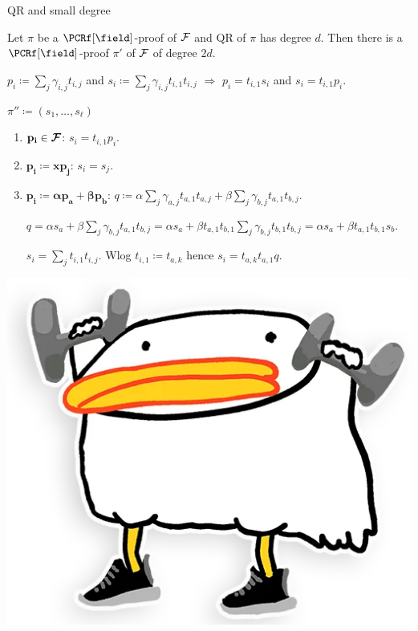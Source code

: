 \begin{frame}{QR and small degree}
    
    \begin{lemma}
        Let $\pi$ be a $\PCRf[\field]$-proof of $\mathcal{F}$ and QR of $\pi$ has degree $d$. Then there is a
        $\PCRf[\field]$-proof $\pi'$ of $\mathcal{F}$ of degree $2d$.
    \end{lemma}

    \pause
    $p_i \coloneqq \sum\limits_{j} \gamma_{i, j} t_{i, j}$ and $s_i \coloneqq \sum\limits_{j}
    \gamma_{i, j} t_{i, 1} t_{i, j}$
    \hspace{0.4cm} $\Rightarrow$ \hspace{0.4cm} $p_i = t_{i, 1} s_i$ and $s_i = t_{i, 1} p_i$.

    \pause
    $\pi'' \coloneqq (s_1, \dots, s_{\ell})$
    \pause
    \begin{enumerate}
        \item $\mathbf{p_i \in \boldsymbol{\mathcal{F}}}$: \hspace{0.3cm} $s_i = t_{i, 1} p_i$.
        \item $\mathbf{p_i \coloneqq x p_j}$: \hspace{0.3cm} $s_i = s_j$.
        \item $\mathbf{p_i \coloneqq \boldsymbol{\alpha} p_a + \boldsymbol{\beta} p_b}$: \hspace{0.3cm}
            \pause $q \coloneqq \alpha \sum\limits_{j} \gamma_{a, j} t_{a, 1} t_{a, j} + \beta
            \sum\limits_{j} \gamma_{b, j} t_{a, 1}
            t_{b, j}$.

            \pause
            $q = \alpha s_{a} +  \beta \sum\limits_{j} \gamma_{b, j} t_{a, 1} t_{b, j} = \alpha s_a +
            \beta t_{a, 1} t_{b, 1} \sum\limits_{j} \gamma_{b, j} t_{b, 1} t_{b, j} = \alpha s_a +
            \beta t_{a, 1} t_{b, 1} s_b$.

            \pause
            $s_i = \sum\limits_{j} t_{i, 1} t_{i, j}$. Wlog $t_{i, 1} \coloneqq t_{a, k}$ hence $s_i =
            t_{a, k} t_{a, 1} q$.
    \end{enumerate}

    \pause
    \begin{center}
        \includegraphics[scale = 0.1]{pics/utya-lift.png}
    \end{center}
\end{frame}
